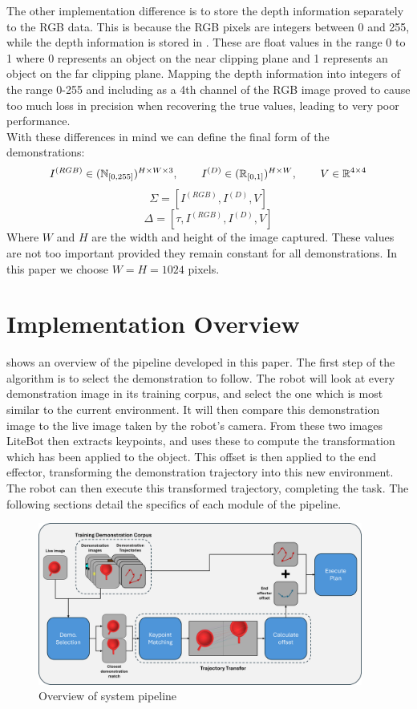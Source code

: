 The other implementation difference is to store the depth information separately to the RGB data. This is because the RGB pixels are integers between 0 and 255, while the depth information is stored in  \cite{ndc}. These are float values in the range 0 to 1 where 0 represents an object on the near clipping plane and 1 represents an object on the far clipping plane. Mapping the depth information into integers of the range 0-255 and including as a 4th channel of the RGB image proved to cause too much loss in precision when recovering the true values, leading to very poor performance.\\

With these differences in mind we can define the final form of the demonstrations:
$$I^{(RGB)} \in (\operatorname{\mathbb{N}}_{[0,255]})^{H \times W \times 3}, \operatorname{\operatorname{\: \: \: \:} \operatorname{\: \: \: \:}}
I^{(D)} \in (\operatorname{\mathbb{R}}_{[0,1]})^{H \times W}, \operatorname{\operatorname{\: \: \: \:} \operatorname{\: \: \: \:}}
V \in \operatorname{\mathbb{R}}^{4 \times 4}$$
$$\Sigma = [I^{(RGB)}, I^{(D)}, V]$$
$$\Delta = [\tau, I^{(RGB)}, I^{(D)}, V]$$
Where $W$ and $H$ are the width and height of the image captured. These values are not too important provided they remain constant for all demonstrations. In this paper we choose $W=H=1024$ pixels.


\section{Implementation Overview}
\label{sec:implementation}

 shows an overview of the pipeline developed in this paper. The first step of the algorithm is to select the demonstration to follow. The robot will look at every demonstration image in its training corpus, and select the one which is most similar to the current environment. It will then compare this demonstration image to the live image taken by the robot's camera. From these two images LiteBot then extracts keypoints, and uses these to compute the transformation which has been applied to the object. This offset is then applied to the end effector, transforming the demonstration trajectory into this new environment. The robot can then execute this transformed trajectory, completing the task. The following sections detail the specifics of each module of the pipeline.

\begin{figure}[h]
    \centering
    \includegraphics[width=0.95\textwidth]{figures/pipeline.png}
    \caption{Overview of system pipeline}
    \label{fig:pipeline}
\end{figure}

